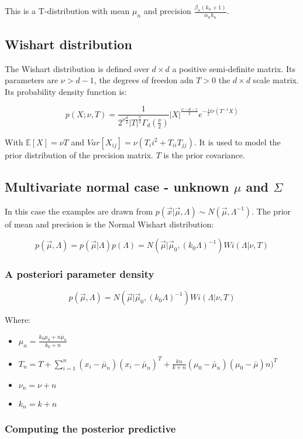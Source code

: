 		This is a T-distribution with mean $\mu_n$ and precision $\frac{\beta_n(k_n+1)}{\alpha_n k_n}$.

	\subsection{Wishart distribution}
	The Wishart distribution is defined over $d\times d$ a positive semi-definite matrix.
	Its parameters are $\nu>d-1$, the degrees of freedon adn $T>0$ the $d\times d$ scale matrix.
	Its probability density function is:

	$$p(X;\nu, T) = \frac{1}{2^{\nu\frac{d}{2}}|T|^{\frac{\nu}{2}}\Gamma_d(\frac{\nu}{2})}|X|^{\frac{\nu-d-1}{2}}e^{-\frac{1}{2}tr(T^{-1}X)}$$

	With $\mathbb{E}[X] = \nu T$ and $Var[X_{ij}] = \nu(T_ii^2+T_{ii}T_{jj})$.
	It is used to model the prior distribution of the precision matrix.
	$T$ is the prior covariance.

	\subsection{Multivariate normal case - unknown $\mu$ and $\Sigma$}
	In this case the examples are drawn from $p(\vec{x}|\vec{\mu}, \Lambda)\sim N(\vec{\mu}, \Lambda^{-1})$.
	The prior of mean and precision is the Normal Wishart distribution:

	$$p(\vec{\mu}, \Lambda) = p(\vec{\mu}|\Lambda)p(\Lambda) = N(\vec{\mu}|\vec{\mu}_0, (k_0\Lambda)^{-1})Wi(\Lambda|\nu, T)$$

		\subsubsection{A posteriori parameter density}

		$$p(\vec{\mu}, \Lambda) = N(\vec{\mu}|\vec{\mu}_0, (k_0\Lambda)^{-1})Wi(\Lambda|\nu, T)$$

		Where:

		\begin{itemize}
			\item $\mu_n = \frac{k_0\mu_0+n\bar{\mu}_n}{k_0+n}$
			\item $T_n = T+\sum\limits_{i=1}^n(x_i-\bar{\mu}_n)(x_i-\bar{\mu}_n)^T + \frac{kn}{k+n}(\mu_0-\bar{\mu}_n)(\mu_0-\bar{\mu})n)^T$
			\item $\nu_n = \nu+n$
			\item $k_n = k+n$
		\end{itemize}

		\subsubsection{Computing the posterior predictive}

